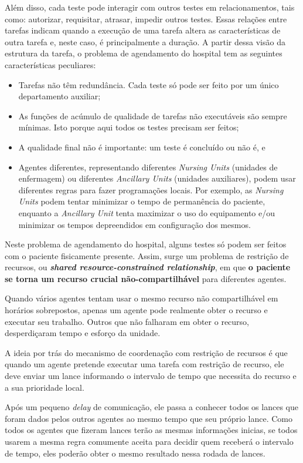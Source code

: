 \begin{description}
Além disso, cada teste pode interagir com outros testes em relacionamentos, tais como: autorizar, requisitar, atrasar, impedir outros testes. Essas relações entre tarefas indicam quando a execução de uma tarefa altera as características de outra tarefa e, neste caso, é principalmente a duração. A partir dessa visão da estrutura da tarefa, o problema de agendamento do hospital tem as seguintes características peculiares:
\begin{itemize}
    \item Tarefas não têm redundância. Cada teste só pode ser feito por um único departamento auxiliar;
    \item As funções de acúmulo de qualidade de tarefas não executáveis são sempre mínimas. Isto porque aqui todos os testes precisam ser feitos;
    \item A qualidade final não é importante: um teste é concluído ou não é, e
    \item Agentes diferentes, representando diferentes \textit{Nursing Units} (unidades de enfermagem) ou diferentes \textit{Ancillary Units} (unidades auxiliares), podem usar diferentes regras para fazer programações locais. Por exemplo, as \textit{Nursing Units} podem tentar minimizar o tempo de permanência do paciente, enquanto a \textit{Ancillary Unit}  tenta maximizar o uso do equipamento e/ou minimizar os tempos depreendidos em configuração dos mesmos.
\end{itemize}


Neste problema de agendamento do hospital, alguns testes só podem ser feitos com o paciente fisicamente presente. Assim, surge um problema de restrição de recursos, ou \textbf{\textit{shared resource-constrained relationship}}, em que \textbf{o paciente se torna um recurso crucial não-compartilhável} para diferentes agentes. 

Quando vários agentes tentam usar o mesmo recurso não compartilhável em horários sobrepostos, apenas um agente pode realmente obter o recurso e executar seu trabalho. Outros que não falharam em obter o recurso, desperdiçaram tempo e esforço da unidade.

A ideia por trás do mecanismo de coordenação com restrição de recursos é que quando um agente pretende executar uma tarefa com restrição de recurso, ele deve enviar um lance informando o intervalo de tempo que necessita do recurso e a sua prioridade local. 

Após um pequeno \textit{delay} de comunicação, ele passa a conhecer todos os lances que foram dados pelos outros agentes ao mesmo tempo que seu próprio lance. Como todos os agentes que fizeram lances terão as mesmas informações inicias, se todos usarem a mesma regra comumente aceita para decidir quem receberá o intervalo de tempo, eles poderão obter o mesmo resultado nessa rodada de lances.


\end{description}
